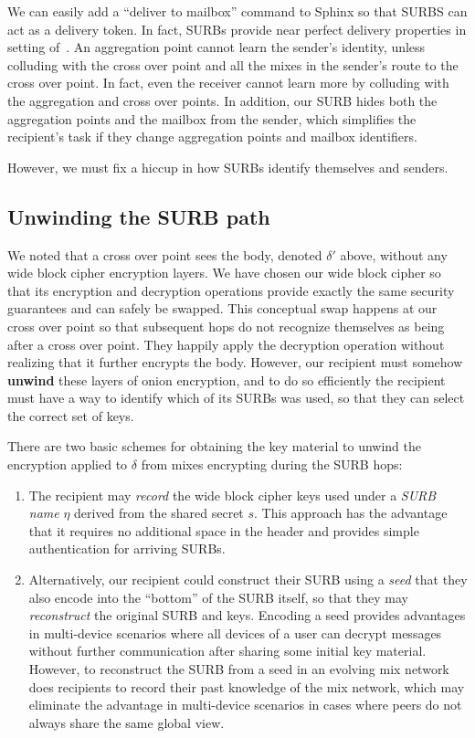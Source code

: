 \documentclass[twoside,letterpaper]{llncs}
\begin{document}
We can easily add a ``deliver to mailbox'' command to Sphinx so that SURBS
can act as a delivery token.  In fact, SURBs provide near perfect
delivery properties in setting of~\cite{warner-delivery}.
An aggregation point cannot learn the sender's identity, unless
colluding with the cross over point and all the mixes in the 
sender's route to the cross over point.  
In fact, even the receiver cannot learn more by colluding with
the aggregation and cross over points.  In addition, our SURB
hides both the aggregation points and the mailbox from the sender,
which simplifies the recipient's task if they change aggregation
points and mailbox identifiers.

However, we must fix a hiccup in how SURBs identify themselves
and senders.

\subsection{Unwinding the SURB path}

We noted that a cross over point sees the body, denoted $\delta'$
above, without any wide block cipher encryption layers.  We have
chosen our wide block cipher so that its encryption and decryption
operations provide exactly the same security guarantees and can
safely be swapped.  This conceptual swap happens at our cross over
point so that subsequent hops do not recognize themselves as being
after a cross over point.  They happily apply the decryption
operation without realizing that it further encrypts the body.
However, our recipient must somehow {\bf unwind} these layers of
onion encryption, and to do so efficiently the recipient must have
a way to identify which of its SURBs was used, so that they
can select the correct set of keys.

There are two basic schemes for obtaining the key material to
unwind the encryption applied to $\delta$ from mixes encrypting
during the SURB hops:

\begin{enumerate}
 \item The recipient may {\em record} the wide block cipher keys used
   under a {\it SURB name} $\eta$ derived from the shared secret $s$.
   This approach has the advantage that it requires no additional
   space in the header and provides simple authentication for arriving
   SURBs.

 \item Alternatively, our recipient could construct their SURB using a
   {\em seed} that they also encode into the ``bottom'' of the SURB
   itself, so that they may {\em reconstruct} the original SURB and
   keys.  Encoding a seed provides advantages in multi-device
   scenarios where all devices of a user can decrypt messages without
   further communication after sharing some initial key material.
   However, to reconstruct the SURB from a seed in an evolving
   mix network does recipients to record their past knowledge of
   the mix network, which may eliminate the advantage in multi-device
   scenarios in cases where peers do not always share the same global
   view.
\end{enumerate}
\end{document}
